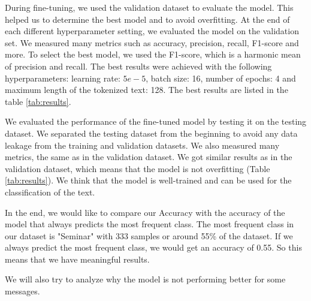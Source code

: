 \documentclass[fleqn,moreauthors,10pt]{ds_report}
\begin{document}
During fine-tuning, we used the validation dataset to evaluate the model. This helped us to determine the best model and to avoid overfitting. At the end of each different hyperparameter setting, we evaluated the model on the validation set. We measured many metrics such as accuracy, precision, recall, F1-score and more.
To select the best model, we used the F1-score, which is a harmonic mean of precision and recall. The best results were achieved with the following hyperparameters: learning rate: $5e-5$, batch size: 16, number of epochs: 4 and maximum length of the tokenized text: 128. The best results are listed in the table \ref{tab:results}.

We evaluated the performance of the fine-tuned model by testing it on the testing dataset. We separated the testing dataset from the beginning to avoid any data leakage from the training and validation datasets. We also measured many metrics, the same as in the validation dataset. We got similar results as in the validation dataset, which means that the model is not overfitting (Table 
\ref{tab:results}). We think that the model is well-trained and can be used for the classification of the text.


\begin{table}[htbp]
    \centering
\vspace{0.2cm}
\caption{Results of the fine-tuned model}
\label{tab:results}
\end{table}


In the end, we would like to compare our Accuracy with the accuracy of the model that always predicts the most frequent class.
The most frequent class in our dataset is "Seminar" with 333 samples or around 55\% of the dataset. 
If we always predict the most frequent class, we would get an accuracy of 0.55. So this means that we have meaningful results.

We will also try to analyze why the model is not performing better for some messages.
\end{document}
